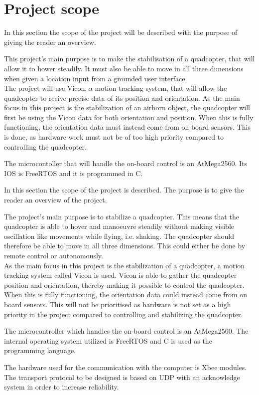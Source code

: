 \section{Project scope}

In this section the scope of the project will be described with the purpose of giving the reader an overview. \newpar

This project's main purpose is to make the stabilisation of a quadcopter, that will allow it to hower steadily. It must also be able to move in all three dimensions when given a location input from a grounded user interface. \\
The project will use Vicon, a motion tracking system, that will allow the quadcopter to recive precise data of its position and orientation. 
As the main focus in this project is the stabilization of an airborn object, the quadcopter will first be using the Vicon data for both orientation and position. When this is fully functioning, the orientation data must instead come from on board sensors. This is done, as hardware work must not be of too high priority compared to controlling the quadcopter. \newpar

The microcontoller that will handle the on-board control is an AtMega2560. Its IOS is FreeRTOS and it is programmed in C. 


In this section the scope of the project is described. The purpose is to give the reader an overview of the project. \newpar

The project's main purpose is to stabilize a quadcopter. This means that the quadcopter is able to hover and manoeuvre steadily without making visible oscillation like movements while flying, i.e. shaking. The quadcopter should therefore be able to move in all three dimensions. This could either be done by remote control or autonomously.\\

As the main focus in this project is the stabilization of a quadcopter, a motion tracking system called Vicon is used. Vicon is able to gather the quadcopter position and orientation, thereby making it possible to control the quadcopter. When this is fully functioning, the orientation data could instead come from on board sensors. This will not be prioritised as hardware is not set as a high priority in the project compared to controlling and stabilizing the quadcopter. \newpar

The microcontroller which handles the on-board control is an AtMega2560. The internal operating system utilized is FreeRTOS and C is used as the programming language.

The hardware used for the communication with the computer is Xbee modules. The transport protocol to be designed is based on UDP with an acknowledge system in order to increase reliability.